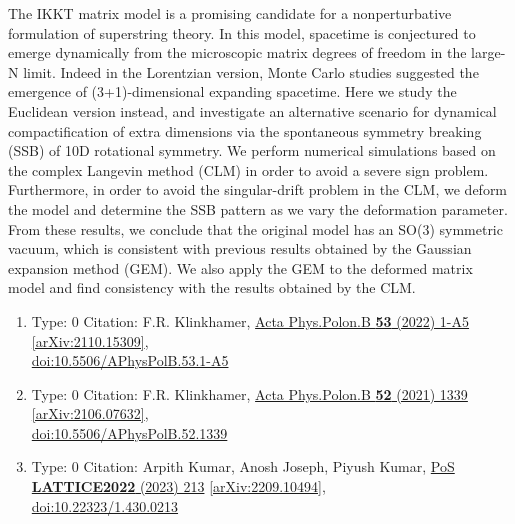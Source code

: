 \documentclass[a4paper,10pt]{article}
\begin{document}
\begin{enumerate}
The IKKT matrix model is a promising candidate for a nonperturbative formulation of superstring theory. In this model, spacetime is conjectured to emerge dynamically from the microscopic matrix degrees of freedom in the large-N limit. Indeed in the Lorentzian version, Monte Carlo studies suggested the emergence of (3+1)-dimensional expanding spacetime. Here we study the Euclidean version instead, and investigate an alternative scenario for dynamical compactification of extra dimensions via the spontaneous symmetry breaking (SSB) of 10D rotational symmetry. We perform numerical simulations based on the complex Langevin method (CLM) in order to avoid a severe sign problem. Furthermore, in order to avoid the singular-drift problem in the CLM, we deform the model and determine the SSB pattern as we vary the deformation parameter. From these results, we conclude that the original model has an SO(3) symmetric vacuum, which is consistent with previous results obtained by the Gaussian expansion method (GEM). We also apply the GEM to the deformed matrix model and find consistency with the results obtained by the CLM.
\begin{enumerate}
  \item Type: 0 Citation: F.R. Klinkhamer, \href{https://www.doi.org/10.5506/APhysPolB.53.1-A5}{Acta Phys.Polon.B {\bf 53} (2022) 1-A5}  \href{https://arxiv.org/abs/2110.15309}{[arXiv:2110.15309]},\\\href{https://www.doi.org/10.5506/APhysPolB.53.1-A5}{doi:10.5506/APhysPolB.53.1-A5}
  \item Type: 0 Citation: F.R. Klinkhamer, \href{https://www.doi.org/10.5506/APhysPolB.52.1339}{Acta Phys.Polon.B {\bf 52} (2021) 1339}  \href{https://arxiv.org/abs/2106.07632}{[arXiv:2106.07632]},\\\href{https://www.doi.org/10.5506/APhysPolB.52.1339}{doi:10.5506/APhysPolB.52.1339}
  \item Type: 0 Citation: Arpith Kumar, Anosh Joseph, Piyush Kumar, \href{https://www.doi.org/10.22323/1.430.0213}{PoS {\bf LATTICE2022} (2023) 213}  \href{https://arxiv.org/abs/2209.10494}{[arXiv:2209.10494]},\\\href{https://www.doi.org/10.22323/1.430.0213}{doi:10.22323/1.430.0213}

\end{enumerate}
\end{enumerate}
\end{document}
